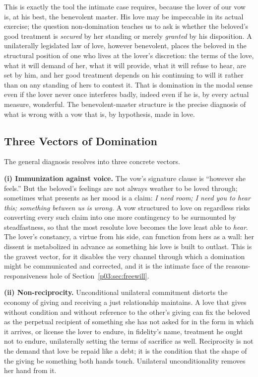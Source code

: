 \documentclass[11pt,a4paper]{article}
\begin{document}
This is exactly the tool the intimate case requires, because the lover of our vow is, at his best, the benevolent master. His love may be impeccable in its actual exercise; the question non-domination teaches us to ask is whether the beloved's good treatment is \emph{secured} by her standing or merely \emph{granted} by his disposition. A unilaterally legislated law of love, however benevolent, places the beloved in the structural position of one who lives at the lover's discretion: the terms of the love, what it will demand of her, what it will provide, what it will refuse to hear, are set by him, and her good treatment depends on his continuing to will it rather than on any standing of hers to contest it. That is domination in the modal sense even if the lover never once interferes badly, indeed even if he is, by every actual measure, wonderful. The benevolent-master structure is the precise diagnosis of what is wrong with a vow that is, by hypothesis, made in love.

\subsection{Three Vectors of Domination}

The general diagnosis resolves into three concrete vectors.

\textbf{(i) Immunization against voice.} The vow's signature clause is ``however she feels.'' But the beloved's feelings are not always weather to be loved through; sometimes what presents as her mood is a claim: \emph{I need room; I need you to hear this; something between us is wrong.} A vow structured to love on regardless risks converting every such claim into one more contingency to be surmounted by steadfastness, so that the most resolute love becomes the love least able to \emph{hear}. The lover's constancy, a virtue from his side, can function from hers as a wall: her dissent is metabolized in advance as something his love is built to outlast. This is the gravest vector, for it disables the very channel through which a domination might be communicated and corrected, and it is the intimate face of the reasons-responsiveness hole of Section~\ref{p03:sec:freewill}.

\textbf{(ii) Non-reciprocity.} Unconditional unilateral commitment distorts the economy of giving and receiving a just relationship maintains. A love that gives without condition and without reference to the other's giving can fix the beloved as the perpetual recipient of something she has not asked for in the form in which it arrives, or license the lover to endure, in fidelity's name, treatment he ought not to endure, unilaterally setting the terms of sacrifice as well. Reciprocity is not the demand that love be repaid like a debt; it is the condition that the shape of the giving be something both hands touch. Unilateral unconditionality removes her hand from it.
\end{document}
